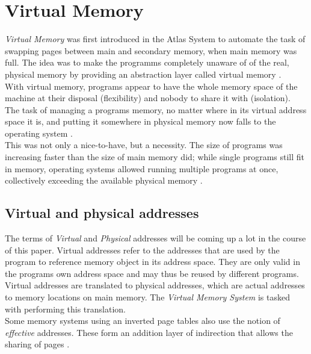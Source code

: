 \section{Virtual Memory}
\textit{Virtual Memory} was first introduced in the Atlas System \cite{fotheringham1961dynamic} to
automate the task of swapping pages between main and secondary memory, when main memory was full.
The idea was to make the programms completely unaware of of the real, physical memory by providing
an abstraction layer called virtual memory \cite{denning1996virtual}.\\
With virtual memory, programs appear to have the whole memory space of the machine at their disposal (flexibility) and
nobody to share it with (isolation).\\
The task of managing a programs memory, no matter where in its virtual address space it is, and putting it somewhere
in physical memory now falls to the operating system \cite{denning1970virtual}.\\
This was not only a nice-to-have, but a necessity. The size of programs was increasing faster than the size of main
memory did; while single programs
still fit in memory, operating systems allowed running multiple programs at once, collectively exceeding
the available physical memory \cite{tanenbaumOS}.

\subsection{Virtual and physical addresses}
The terms of \textit{Virtual} and \textit{Physical} addresses will be coming up a lot in the course of this paper.
Virtual addresses refer to the addresses that are used by the program to reference memory object in its address
space. They are only valid in the programs own address space and may thus be reused by different programs.
Virtual addresses are translated to physical addresses, which are actual addresses to memory locations
on main memory. The \textit{Virtual Memory System} is tasked with performing this translation.
\\
Some memory systems using an inverted page tables also use the notion of \textit{effective} addresses.
These form an addition layer of indirection that allows the sharing of pages \cite{jacob1998virtualissues}.

